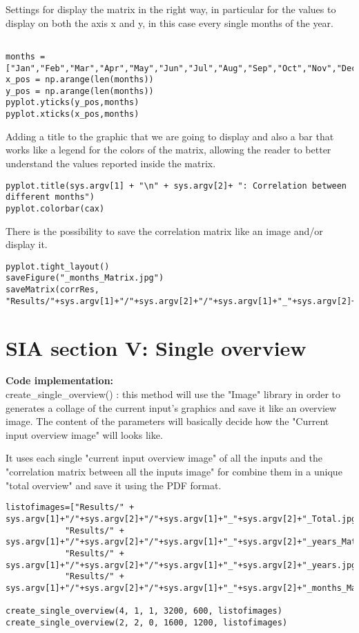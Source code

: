 Settings for display the matrix in the right way, in particular for the values to display on both the axis x and y, in this case every single months of the year.
\begin{lstlisting}

months = ["Jan","Feb","Mar","Apr","May","Jun","Jul","Aug","Sep","Oct","Nov","Dec"]
x_pos = np.arange(len(months))
y_pos = np.arange(len(months))
pyplot.yticks(y_pos,months)
pyplot.xticks(x_pos,months)
\end{lstlisting}
Adding a title to the graphic that we are going to display and also a bar that works like a legend for the colors of the matrix, allowing the reader to better understand the values reported inside the matrix.
\begin{lstlisting}
pyplot.title(sys.argv[1] + "\n" + sys.argv[2]+ ": Correlation between different months")
pyplot.colorbar(cax)
\end{lstlisting}

There is the possibility to save the correlation matrix like an image and/or display it.
\begin{lstlisting}
pyplot.tight_layout()
saveFigure("_months_Matrix.jpg")
saveMatrix(corrRes, "Results/"+sys.argv[1]+"/"+sys.argv[2]+"/"+sys.argv[1]+"_"+sys.argv[2]+"_months_CorrCoeff.csv")

\end{lstlisting}

\section{SIA section V: Single overview}
\label{SIA_section_V}
\textbf{Code implementation:}\\
create\_single\_overview() : this method will use the "Image" library in order to generates a collage of the current input's graphics and save it like an overview image. The content of the parameters will basically decide how the "Current input overview image" will looks like.

It uses each single "current input overview image" of all the inputs and the "correlation matrix between all the inputs image" for combine them in a unique "total overview" and save it using the PDF format.

\begin{lstlisting}
listofimages=["Results/" + sys.argv[1]+"/"+sys.argv[2]+"/"+sys.argv[1]+"_"+sys.argv[2]+"_Total.jpg",
            "Results/" + sys.argv[1]+"/"+sys.argv[2]+"/"+sys.argv[1]+"_"+sys.argv[2]+"_years_Matrix.jpg", 
            "Results/" + sys.argv[1]+"/"+sys.argv[2]+"/"+sys.argv[1]+"_"+sys.argv[2]+"_years.jpg",
            "Results/" + sys.argv[1]+"/"+sys.argv[2]+"/"+sys.argv[1]+"_"+sys.argv[2]+"_months_Matrix.jpg"]

create_single_overview(4, 1, 1, 3200, 600, listofimages)
create_single_overview(2, 2, 0, 1600, 1200, listofimages)
\end{lstlisting}
